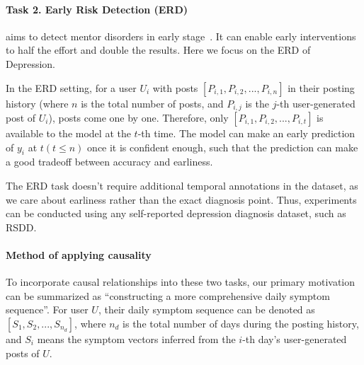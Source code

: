 \paragraph{Task 2. Early Risk Detection (ERD)} aims to detect mentor disorders in early stage~\cite{losada2016test,zhang2022psychiatric}. It can enable early interventions to half the effort and double the results. Here we focus on the ERD of Depression.

In the ERD setting, for a user $U_i$ with posts $[P_{i,1}, P_{i,2}, ..., P_{i,n}]$ in their posting history (where $n$ is the total number of posts, and $P_{i,j}$ is the $j$-th user-generated post of $U_i$), posts come one by one. Therefore, only $[P_{i,1}, P_{i,2}, ..., P_{i,t}]$ is available to the model at the $t$-th time. The model can make an early prediction of $y_i$ at $t (t \leq n)$ once it is confident enough, such that the prediction can make a good tradeoff between accuracy and earliness. 

The ERD task doesn't require additional temporal annotations in the dataset, as we care about earliness rather than the exact diagnosis point. Thus, experiments can be conducted using any self-reported depression diagnosis dataset, such as RSDD.

\paragraph{Method of applying causality}

To incorporate causal relationships into these two tasks, our primary motivation can be summarized as ``constructing a more comprehensive daily symptom sequence''. For user $U$, their daily symptom sequence can be denoted as $[S_{1}, S_{2}, ..., S_{n_d}]$, where $n_d$ is the total number of days during the posting history, and $S_{i}$ means the symptom vectors inferred from the $i$-th day's user-generated posts of $U$.


